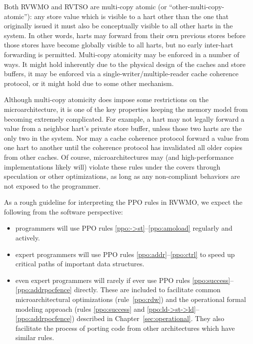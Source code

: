 Both RVWMO and RVTSO are multi-copy atomic (or ``other-multi-copy-atomic''): any store value which is visible to a hart other than the one that originally issued it must also be conceptually visible to all other harts in the system.
In other words, harts may forward from their own previous stores before those stores have become globally visible to all harts, but no early inter-hart forwarding is permitted.
Multi-copy atomicity may be enforced in a number of ways.
It might hold inherently due to the physical design of the caches and store buffers, it may be enforced via a single-writer/multiple-reader cache coherence protocol, or it might hold due to some other mechanism.

Although multi-copy atomicity does impose some restrictions on the microarchitecture, it is one of the key properties keeping the memory model from becoming extremely complicated.
For example, a hart may not legally forward a value from a neighbor hart's private store buffer, unless those two harts are the only two in the system.
Nor may a cache coherence protocol forward a value from one hart to another until the coherence protocol has invalidated all older copies from other caches.
Of course, microarchitectures may (and high-performance implementations likely will) violate these rules under the covers through speculation or other optimizations, as long as any non-compliant behaviors are not exposed to the programmer.

As a rough guideline for interpreting the PPO rules in RVWMO, we expect the following from the software perspective:
\begin{itemize}
  \item programmers will use PPO rules \ref{ppo:->st}--\ref{ppo:amoload} regularly and actively.
  \item expert programmers will use PPO rules \ref{ppo:addr}--\ref{ppo:ctrl} to speed up critical paths of important data structures.
  \item even expert programmers will rarely if ever use PPO rules \ref{ppo:success}--\ref{ppo:addrpocfence} directly.  These are included to facilitate common microarchitectural optimizations (rule~\ref{ppo:rdw}) and the operational formal modeling approach (rules \ref{ppo:success} and \ref{ppo:ld->st->ld}--\ref{ppo:addrpocfence}) described in Chapter~\ref{sec:operational}.  They also facilitate the process of porting code from other architectures which have similar rules.
\end{itemize}


